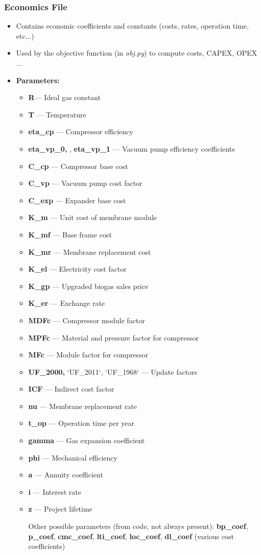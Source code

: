 \documentclass[12pt]{article}
\theoremstyle{definition}
\theoremstyle{definition}
\theoremstyle{remark}
\theoremstyle{remark}
\theoremstyle{definition}
\theoremstyle{remark}
\begin{document}
\subsubsection{Economics File}
\begin{itemize}
	\item Contains economic coefficients and constants (costs, rates, operation time, etc...)
	\item Used by the objective function (in \emph{obj.py}) to compute costs, CAPEX, OPEX ...
	\item \textbf{Parameters:}
		\begin{itemize}
			\item \textbf{R}— Ideal gas constant
			\item \textbf{T }— Temperature
			\item \textbf{eta\_cp }— Compressor efficiency
			\item \textbf{eta\_vp\_0, }, \textbf{eta\_vp\_1} — Vacuum pump efficiency coefficients
			\item \textbf{C\_cp }— Compressor base cost
			\item \textbf{C\_vp }— Vacuum pump cost factor
			\item \textbf{C\_exp }— Expander base cost
			\item \textbf{K\_m }— Unit cost of membrane module
			\item \textbf{K\_mf }— Base frame cost
			\item \textbf{K\_mr }— Membrane replacement cost
			\item \textbf{K\_el }— Electricity cost factor
			\item \textbf{K\_gp }— Upgraded biogas sales price
			\item \textbf{K\_er }— Exchange rate
			\item \textbf{MDFc }— Compressor module factor
			\item \textbf{MPFc }— Material and pressure factor for compressor
			\item \textbf{MFc }— Module factor for compressor
			\item \textbf{UF\_2000, }`UF\_2011`, `UF\_1968` — Update factors
			\item \textbf{ICF }— Indirect cost factor
			\item \textbf{nu }— Membrane replacement rate
			\item \textbf{t\_op }— Operation time per year
			\item \textbf{gamma }— Gas expansion coefficient
			\item \textbf{phi }— Mechanical efficiency
			\item \textbf{a }— Annuity coefficient
			\item \textbf{i }— Interest rate
			\item \textbf{z }— Project lifetime

Other possible parameters (from code, not always present):
\textbf{bp\_coef}, \textbf{p\_coef}, \textbf{cmc\_coef}, \textbf{lti\_coef}, \textbf{loc\_coef}, \textbf{dl\_coef} (various cost coefficients)

			
		\end{itemize}
	
\end{itemize}
\end{document}
